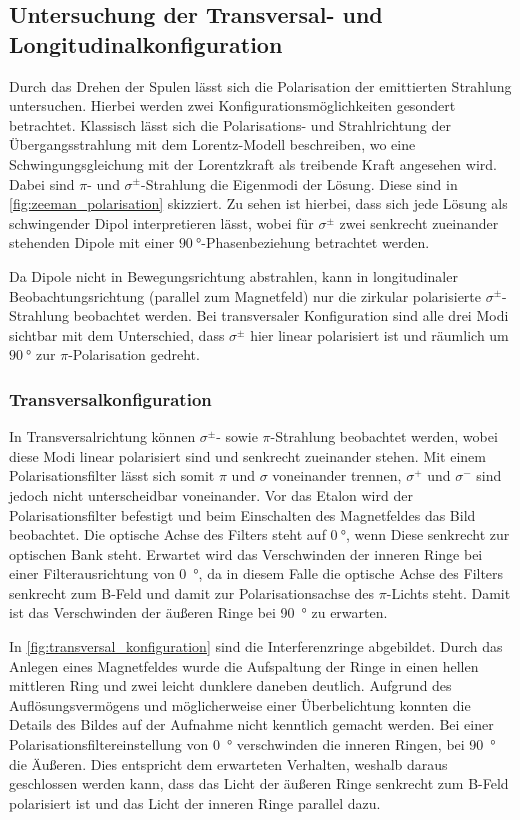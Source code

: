 \subsection{Untersuchung der Transversal- und Longitudinalkonfiguration}
Durch das Drehen der Spulen lässt sich die Polarisation der emittierten Strahlung 
untersuchen. Hierbei werden zwei Konfigurationsmöglichkeiten gesondert betrachtet.
Klassisch lässt sich die Polarisations- und Strahlrichtung der Übergangsstrahlung 
mit dem Lorentz-Modell beschreiben, wo eine Schwingungsgleichung mit der Lorentzkraft als 
treibende Kraft angesehen wird. Dabei sind $\pi$- und $\sigma^\pm$-Strahlung die Eigenmodi 
der Lösung. Diese sind in \cref{fig:zeeman_polarisation} skizziert. Zu sehen ist hierbei, 
dass sich jede Lösung als schwingender Dipol interpretieren lässt, wobei für $\sigma^\pm$ 
zwei senkrecht zueinander stehenden Dipole mit einer $\SI{90}{\degree}$-Phasenbeziehung 
betrachtet werden.

Da Dipole nicht in Bewegungsrichtung abstrahlen, kann in longitudinaler 
Beobachtungsrichtung (parallel zum Magnetfeld) nur die zirkular polarisierte $\sigma^\pm$-Strahlung
beobachtet werden. Bei transversaler Konfiguration sind alle drei Modi sichtbar mit dem 
Unterschied, dass $\sigma^\pm$ hier linear polarisiert ist und räumlich um $\SI{90}{\degree}$
zur $\pi$-Polarisation gedreht.

\subsubsection{Transversalkonfiguration}
In Transversalrichtung können $\sigma^\pm$- sowie $\pi$-Strahlung beobachtet werden, wobei 
diese Modi linear polarisiert sind und senkrecht zueinander stehen. Mit einem Polarisationsfilter 
lässt sich somit $\pi$ und $\sigma$ voneinander trennen, $\sigma^+$ und $\sigma^-$ sind jedoch nicht 
unterscheidbar voneinander. Vor das Etalon wird der Polarisationsfilter befestigt und 
beim Einschalten des Magnetfeldes das Bild beobachtet. Die optische Achse 
des Filters steht auf $\SI{0}{\degree}$, wenn Diese senkrecht zur optischen Bank
steht. Erwartet wird das Verschwinden der inneren Ringe bei einer Filterausrichtung von 
\SI{0}{\degree}, da in diesem Falle die optische Achse des Filters senkrecht zum B-Feld und damit 
zur Polarisationsachse des $\pi$-Lichts steht. Damit ist das Verschwinden der äußeren Ringe 
bei \SI{90}{\degree} zu erwarten.

In \cref{fig:transversal_konfiguration} sind die Interferenzringe abgebildet. Durch das Anlegen
eines Magnetfeldes wurde die Aufspaltung der Ringe in einen hellen mittleren 
Ring und zwei leicht dunklere daneben deutlich. Aufgrund des Auflösungsvermögens und möglicherweise 
einer Überbelichtung konnten die Details des Bildes auf der Aufnahme nicht kenntlich
gemacht werden. Bei einer Polarisationsfiltereinstellung von \SI{0}{\degree} verschwinden
die inneren Ringen, bei \SI{90}{\degree} die Äußeren. Dies entspricht dem erwarteten Verhalten, 
weshalb daraus geschlossen werden kann, dass das Licht der äußeren Ringe senkrecht zum 
B-Feld polarisiert ist und das Licht der inneren Ringe parallel dazu.

